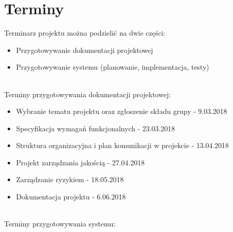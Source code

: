 \documentclass{article}
\begin{document}
\section{Terminy}
Terminarz projektu można podzielić na dwie części:
\begin{itemize}
\item Przygotowywanie dokumentacji projektowej
\item Przygotowywanie systemu (planowanie, implementacja, testy)
\end{itemize}\mbox{}\\
Terminy przygotowywania dokumentacji projektowej:
\begin{itemize}
\item Wybranie tematu projektu oraz zgłoszenie składu grupy - 9.03.2018
\item Specyfikacja wymagań funkcjonalnych - 23.03.2018
\item Struktura organizacyjna i plan komunikacji w projekcie - 13.04.2018
\item Projekt zarządzania jakością - 27.04.2018
\item Zarządzanie ryzykiem - 18.05.2018
\item Dokumentacja projektu - 6.06.2018
\end{itemize}\mbox{}\\
Terminy przygotowywania systemu:
\end{document}
